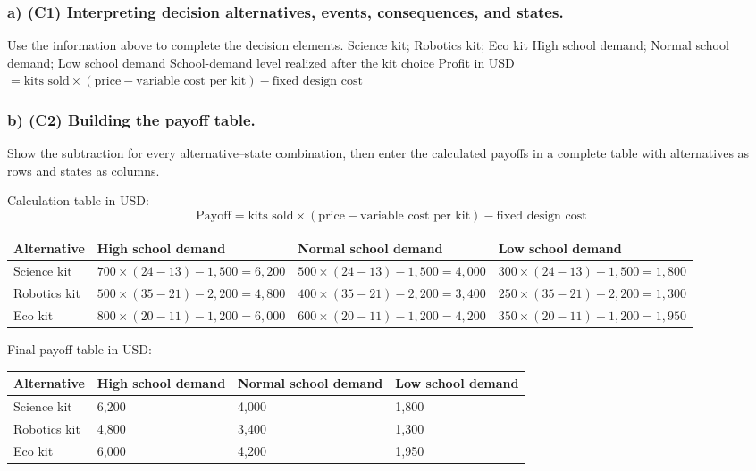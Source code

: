 \subsubsection*{a) \textbf{(C1)} Interpreting decision alternatives, events, consequences, and states.}
\label{subsec:problem14-learning-kit-supplier-c1}
Use the information above to complete the decision elements.
\DecisionElementsTable
{Science kit; Robotics kit; Eco kit}
{High school demand; Normal school demand; Low school demand}
{School-demand level realized after the kit choice}
{Profit in USD $= \text{kits sold} \times (\text{price} - \text{variable cost per kit}) - \text{fixed design cost}$}
\subsubsection*{b) \textbf{(C2)} Building the payoff table.}
\label{subsec:problem14-learning-kit-supplier-c2}
Show the subtraction for every alternative--state combination, then enter the calculated payoffs in a complete table with alternatives as rows and states as columns.

Calculation table in USD:
\[
\text{Payoff}=\text{kits sold}\times(\text{price}-\text{variable cost per kit})-\text{fixed design cost}
\]
\begin{center}
\small
\begin{tabular}{llll}
\toprule
Alternative & High school demand & Normal school demand & Low school demand \\
\midrule
Science kit & $700 \times (24 - 13) - 1{,}500 = 6{,}200$ & $500 \times (24 - 13) - 1{,}500 = 4{,}000$ & $300 \times (24 - 13) - 1{,}500 = 1{,}800$ \\
Robotics kit & $500 \times (35 - 21) - 2{,}200 = 4{,}800$ & $400 \times (35 - 21) - 2{,}200 = 3{,}400$ & $250 \times (35 - 21) - 2{,}200 = 1{,}300$ \\
Eco kit & $800 \times (20 - 11) - 1{,}200 = 6{,}000$ & $600 \times (20 - 11) - 1{,}200 = 4{,}200$ & $350 \times (20 - 11) - 1{,}200 = 1{,}950$ \\
\bottomrule
\end{tabular}
\end{center}

Final payoff table in USD:
\begin{center}
\begin{tabular}{llll}
\toprule
Alternative & High school demand & Normal school demand & Low school demand \\
\midrule
Science kit & 6{,}200 & 4{,}000 & 1{,}800 \\
Robotics kit & 4{,}800 & 3{,}400 & 1{,}300 \\
Eco kit & 6{,}000 & 4{,}200 & 1{,}950 \\
\bottomrule
\end{tabular}
\end{center}
